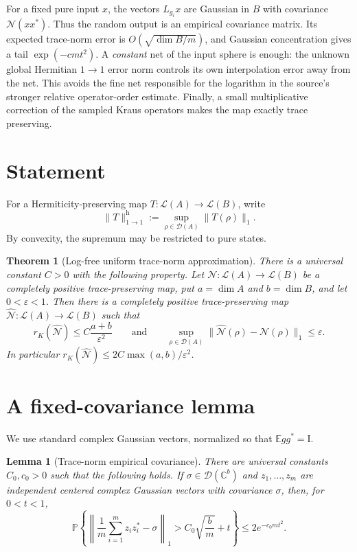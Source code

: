 \documentclass[11pt]{article}
\newtheorem{theorem}{Theorem}
\newtheorem{lemma}{Lemma}
\newcommand{\cL}{\mathcal L}
\newcommand{\cD}{\mathcal D}
\newcommand{\Id}{\mathrm I}
\newcommand{\E}{\mathbb E}
\newcommand{\Pp}{\mathbb P}
\begin{document}
For a fixed pure input $x$, the vectors $L_{g_i}x$ are Gaussian in $B$ with covariance $\mathcal N(xx^*)$.  Thus the random output is an empirical covariance matrix.  Its expected trace-norm error is $O(\sqrt{\dim B/m})$, and Gaussian concentration gives a tail $\exp(-cm t^2)$.  A \emph{constant} net of the input sphere is enough: the unknown global Hermitian $1\to1$ error norm controls its own interpolation error away from the net.  This avoids the fine net responsible for the logarithm in the source's stronger relative operator-order estimate.  Finally, a small multiplicative correction of the sampled Kraus operators makes the map exactly trace preserving.

\section{Statement}

For a Hermiticity-preserving map $T:\cL(A)\to\cL(B)$, write
\[
\|T\|_{1\to1}^{\mathrm h}
 :=\sup_{\rho\in\cD(A)}\|T(\rho)\|_1.
\]
By convexity, the supremum may be restricted to pure states.

\begin{theorem}[Log-free uniform trace-norm approximation]\label{thm:main}
There is a universal constant $C>0$ with the following property.  Let
$\mathcal N:\cL(A)\to\cL(B)$ be a completely positive trace-preserving map, put
$a=\dim A$ and $b=\dim B$, and let $0<\varepsilon<1$.  Then there is a completely positive trace-preserving map $\widehat{\mathcal N}:\cL(A)\to\cL(B)$ such that
\[
r_K(\widehat{\mathcal N})\leq C\frac{a+b}{\varepsilon^2}
\qquad\text{and}\qquad
\sup_{\rho\in\cD(A)}
\|\widehat{\mathcal N}(\rho)-\mathcal N(\rho)\|_1\leq\varepsilon.
\]
In particular $r_K(\widehat{\mathcal N})\leq 2C\max(a,b)/\varepsilon^2$.
\end{theorem}

\section{A fixed-covariance lemma}

We use standard complex Gaussian vectors, normalized so that $\E gg^*=\Id$.

\begin{lemma}[Trace-norm empirical covariance]\label{lem:cov}
There are universal constants $C_0,c_0>0$ such that the following holds.  If $\sigma\in\cD(\mathbb C^b)$ and $z_1,\ldots,z_m$ are independent centered complex Gaussian vectors with covariance $\sigma$, then, for $0<t<1$,
\[
\Pp\!\left\{
\left\|\frac1m\sum_{i=1}^m z_i z_i^*-\sigma\right\|_1
> C_0\sqrt{\frac bm}+t
\right\}
\leq 2e^{-c_0mt^2}.
\]
\end{lemma}
\end{document}
